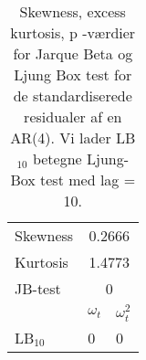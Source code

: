 \begin{table}
\center
\begin{tabular}{lll} \toprule
Skewness & \multicolumn{2}{c}{0.2666} \\
Kurtosis & \multicolumn{2}{c}{1.4773} \\
JB-test & \multicolumn{2}{c}{0} \\ \cmidrule{2-3}	
& $\omega_t$ & $\omega_t^2$ \\
LB$_{10}$ & 0 & 0  \\ \bottomrule
\end{tabular}
\caption{Skewness, excess kurtosis, p -værdier for Jarque Beta og Ljung Box test for de standardiserede residualer af en AR(4). Vi lader LB$_{10}$ betegne Ljung-Box test med lag = 10. } \label{tab:test_ar}
\end{table}